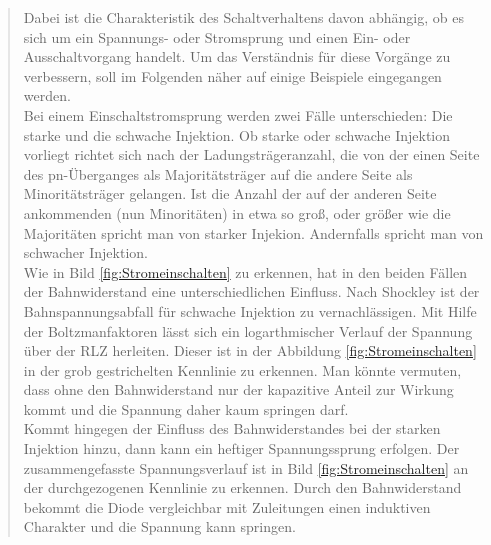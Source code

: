 \begin{quote}
	Dabei ist die Charakteristik des Schaltverhaltens davon abhängig, ob es
	sich um ein Spannungs- oder Stromsprung und einen Ein- oder Ausschaltvorgang
	handelt. Um das Verständnis für diese Vorgänge zu verbessern, soll im
	Folgenden näher auf einige Beispiele eingegangen werden.\\

	Bei einem Einschaltstromsprung werden zwei Fälle unterschieden: Die starke
	und die schwache Injektion. Ob starke oder schwache Injektion vorliegt
	richtet sich nach der Ladungsträgeranzahl, die von der einen Seite des
	pn-Überganges als Majoritätsträger auf die andere Seite als Minoritätsträger
	gelangen. Ist die Anzahl der auf der anderen Seite ankommenden (nun
	Minoritäten) in etwa so groß, oder größer wie die Majoritäten spricht man von
	starker Injekion. Andernfalls spricht man von schwacher Injektion.\\
    Wie in Bild \ref{fig:Stromeinschalten} zu erkennen, hat in den beiden
    Fällen der Bahnwiderstand eine unterschiedlichen Einfluss. Nach Shockley ist der
    Bahnspannungsabfall für schwache Injektion zu vernachlässigen. Mit Hilfe der
    Boltzmanfaktoren lässt sich ein logarthmischer Verlauf der Spannung über der
    RLZ herleiten. Dieser ist in der Abbildung \ref{fig:Stromeinschalten} in der
    grob gestrichelten Kennlinie zu erkennen. Man könnte vermuten, dass ohne den
    Bahnwiderstand nur der kapazitive Anteil zur Wirkung kommt und die Spannung
	daher kaum springen darf.\\
	Kommt hingegen der Einfluss des Bahnwiderstandes bei der starken Injektion
	hinzu, dann kann ein heftiger Spannungssprung erfolgen. Der zusammengefasste
	Spannungsverlauf ist in Bild \ref{fig:Stromeinschalten} an der
	durchgezogenen Kennlinie zu erkennen. Durch den Bahnwiderstand bekommt die
	Diode vergleichbar mit Zuleitungen einen induktiven Charakter und die
	Spannung kann springen.

	\vspace{2em}


\end{quote}
